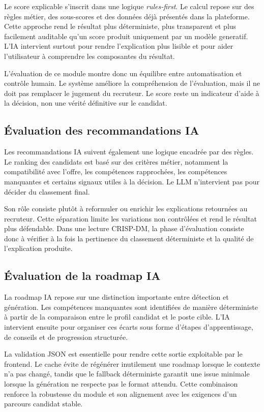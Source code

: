 Le score explicable s'inscrit dans une logique \textit{rules-first}. Le calcul repose sur des règles métier, des sous-scores et des données déjà présentés dans la plateforme. Cette approche rend le résultat plus déterministe, plus transparent et plus facilement auditable qu'un score produit uniquement par un modèle generatif. L'IA intervient surtout pour rendre l'explication plus lisible et pour aider l'utilisateur à comprendre les composantes du résultat.

L'évaluation de ce module montre donc un équilibre entre automatisation et contrôle humain. Le système améliore la compréhension de l'évaluation, mais il ne doit pas remplacer le jugement du recruteur. Le score reste un indicateur d'aide à la décision, non une vérité définitive sur le candidat.

\subsection{Évaluation des recommandations IA}

Les recommandations IA suivent également une logique encadrée par des règles. Le ranking des candidats est basé sur des critères métier, notamment la compatibilité avec l'offre, les compétences rapprochées, les compétences manquantes et certains signaux utiles à la décision. Le LLM n'intervient pas pour décider du classement final.

Son rôle consiste plutôt à reformuler ou enrichir les explications retournées au recruteur. Cette séparation limite les variations non contrôlées et rend le résultat plus défendable. Dans une lecture CRISP-DM, la phase d'évaluation consiste donc à vérifier à la fois la pertinence du classement déterministe et la qualité de l'explication produite.

\subsection{Évaluation de la roadmap IA}

La roadmap IA repose sur une distinction importante entre détection et génération. Les compétences manquantes sont identifiées de manière déterministe à partir de la comparaison entre le profil candidat et le poste cible. L'IA intervient ensuite pour organiser ces écarts sous forme d'étapes d'apprentissage, de conseils et de progression structurée.

La validation JSON est essentielle pour rendre cette sortie exploitable par le frontend. Le cache évite de régénérer inutilement une roadmap lorsque le contexte n'a pas changé, tandis que le fallback déterministe garantit une issue minimale lorsque la génération ne respecte pas le format attendu. Cette combinaison renforce la robustesse du module et son alignement avec les exigences d'un parcours candidat stable.

